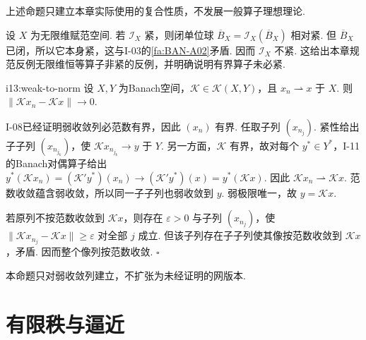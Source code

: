 上述命题只建立本章实际使用的复合性质，不发展一般算子理想理论.

\begin{FACounterexample}[无限维恒等算子不紧]\label{i13:ce-id-noncompact}
设 \(\displaystyle X\) 为无限维赋范空间. 若 \(\displaystyle \mathcal I_X\) 紧，则闭单位球 \(\displaystyle \overline B_X=\mathcal I_X(\overline B_X)\) 相对紧. 但 \(\displaystyle \overline B_X\) 已闭，所以它本身紧，这与I-03的\autoref{fa:BAN-A02}矛盾. 因而 \(\displaystyle \mathcal I_X\) 不紧. 这给出本章规范反例无限维恒等算子非紧的反例，并明确说明有界算子未必紧.
\end{FACounterexample}

\begin{FAProposition}[C][紧算子把弱收敛列送到范数收敛列]{i13:weak-to-norm}
设 \(\displaystyle X,Y\) 为Banach空间，\(\displaystyle \mathcal K\in\mathcal K(X,Y)\)，且 \(\displaystyle x_n\rightharpoonup x\) 于 \(\displaystyle X\). 则 \(\displaystyle \|\mathcal Kx_n-\mathcal Kx\|\to0\).
\end{FAProposition}

\begin{FAProof}
I-08已经证明弱收敛列必范数有界，因此 \(\displaystyle (x_n)\) 有界. 任取子列 \(\displaystyle (x_{n_j})\). 紧性给出子子列 \(\displaystyle (x_{n_{j_k}})\)，使 \(\displaystyle \mathcal Kx_{n_{j_k}}\to y\) 于 \(\displaystyle Y\). 另一方面，\(\displaystyle \mathcal K\) 有界，故对每个 \(\displaystyle y^*\in Y^*\)，I-11的Banach对偶算子给出
\(\displaystyle y^*(\mathcal Kx_n) = (\mathcal K'y^*)(x_n) \to (\mathcal K'y^*)(x) = y^*(\mathcal Kx)\).
因此 \(\displaystyle \mathcal Kx_n\rightharpoonup\mathcal Kx\). 范数收敛蕴含弱收敛，所以同一子子列也弱收敛到 \(\displaystyle y\). 弱极限唯一，故 \(\displaystyle y=\mathcal Kx\).

若原列不按范数收敛到 \(\displaystyle \mathcal Kx\)，则存在 \(\displaystyle \varepsilon>0\) 与子列 \(\displaystyle (x_{n_j})\)，使 \(\displaystyle \|\mathcal Kx_{n_j}-\mathcal Kx\|\geqslant\varepsilon\) 对全部 \(\displaystyle j\) 成立. 但该子列存在子子列使其像按范数收敛到 \(\displaystyle \mathcal Kx\)，矛盾. 因而整个像列按范数收敛.
\hfill\(\square\)
\end{FAProof}

本命题只对弱收敛列建立，不扩张为未经证明的网版本.

\section{有限秩与逼近}\label{sec:i13-finite-rank}


